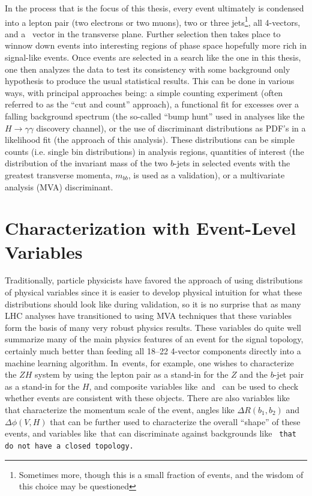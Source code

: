 In the process that is the focus of this thesis, every event ultimately is condensed into a lepton pair (two electrons or two muons), two or three jets\footnote{Sometimes more, though this is a small fraction of events, and the wisdom of this choice may be questioned}, all 4-vectors, and a \met\, vector in the transverse plane.  Further selection then takes place to winnow down events into interesting regions of phase space hopefully more rich in signal-like events.  Once events are selected in a search like the one in this thesis, one then analyzes the data to test its consistency with some background only hypothesis to produce the usual statistical results.  This can be done in various ways, with principal approaches being: a simple counting experiment (often referred to as the ``cut and count'' approach), a functional fit for excesses over a falling background spectrum (the so-called ``bump hunt'' used in analyses like the $H\to\gamma\gamma$ discovery channel), or the use of discriminant distributions as PDF's in a likelihood fit (the approach of this analysis).  These distributions can be simple counts (i.e. single bin distributions) in analysis regions, quantities of interest (the distribution of the invariant mass of the two $b$-jets in selected events with the greatest transverse momenta, $m_{bb}$, is used as a validation), or a multivariate analysis (MVA) discriminant.

\section{Characterization with Event-Level Variables}
Traditionally, particle physicists have favored the approach of using distributions of physical variables since it is easier to develop physical intuition for what these distributions should look like during validation, so it is no surprise that as many LHC analyses have transitioned to using MVA techniques that these variables form the basis of many very robust physics results.  These variables do quite well summarize many of the main physics features of an event for the signal topology, certainly much better than feeding all 18--22 4-vector components directly into a machine learning algorithm.  In \ZH\,events, for example, one wishes to characterize the $ZH$ system by using the lepton pair as a stand-in for the $Z$ and the $b$-jet pair as a stand-in for the $H$, and composite variables like \mbb\,and \mll\, can be used to check whether events are consistent with these objects.  There are also variables like \ptv\, that characterize the momentum scale of the event, angles like $\Delta R\left(b_1,b_2\right)$ and $\Delta\phi\left(V,H\right)$ that can be further used to characterize the overall ``shape'' of these events, and variables like \met\,that can discriminate against backgrounds like \tt\,that do not have a closed topology.

